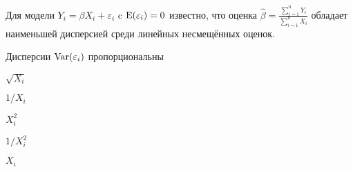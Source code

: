 
\begin{question}
Для модели \(Y_i = \beta X_i + \varepsilon_i\) c
\(\operatorname{E}(\varepsilon_i) = 0\) известно, что оценка
\(\hat \beta = \frac{\sum_{i=1}^n Y_i}{\sum_{i=1}^n X_i}\) обладает
наименьшей дисперсией среди линейных несмещённых оценок.

Дисперсии \(\operatorname{Var}(\varepsilon_i)\) пропорциональны
\begin{answerlist}
  \item \(\sqrt{X_i}\)
  \item \(1/X_i\)
  \item \(X_i^2\)
  \item \(1/X_i^2\)
  \item \(X_i\)
\end{answerlist}
\end{question}


